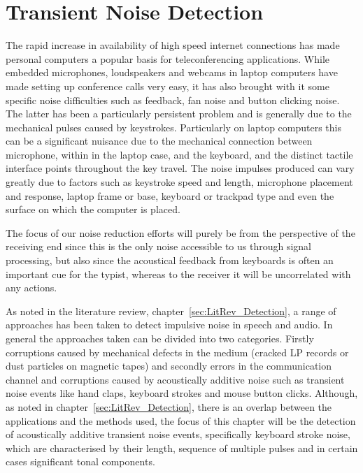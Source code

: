 \chapter{Transient Noise Detection}\label{ch:TransientNoiseDetection}

\ifpdf
    \graphicspath{{Chapter5_TransNoiseDet/Chapter5Figs/PNG/}{Chapter5_TransNoiseDet/Chapter5Figs/PDF/}{Chapter5_TransNoiseDet/Chapter5Figs/}{Chapter5_TransNoiseDet/Chapter5Figs/NoiseBurstModel/}{Chapter5_TransNoiseDet/Chapter5Figs/ARFilterMethod/}}
\else
    \graphicspath{{Chapter5_TransNoiseDet/Chapter5Figs/EPS/}{Chapter5_TransNoiseDet/Chapter5Figs/}}
\fi

The rapid increase in availability of high speed internet connections has made personal computers a popular basis for teleconferencing applications. While embedded microphones, loudspeakers and webcams in laptop computers have made setting up conference calls very easy, it has also brought with it some specific noise difficulties such as feedback, fan noise and button clicking noise. The latter has been a particularly persistent problem and is generally due to the mechanical pulses caused by keystrokes. Particularly on laptop computers this can be a significant nuisance due to the mechanical connection between microphone, within in the laptop case, and the keyboard, and the distinct tactile interface points throughout the key travel. The noise impulses produced can vary greatly due to factors such as keystroke speed and length, microphone placement and response, laptop frame or base, keyboard or trackpad type and even the surface on which the computer is placed.

The focus of our noise reduction efforts will purely be from the perspective of the receiving end since this is the only noise accessible to us through signal processing, but also since the acoustical feedback from keyboards is often an important cue for the typist, whereas to the receiver it will be uncorrelated with any actions.

As noted in the literature review, chapter~\ref{sec:LitRev_Detection}, a range of approaches has been taken to detect impulsive noise in speech and audio. In general the approaches taken can be divided into two categories. Firstly corruptions caused by mechanical defects in the medium (cracked LP records or dust particles on magnetic tapes) and secondly errors in the communication channel and corruptions caused by acoustically additive noise such as transient noise events like hand claps, keyboard strokes and mouse button clicks. Although, as noted in chapter~\ref{sec:LitRev_Detection}, there is an overlap between the applications and the methods used, the focus of this chapter will be the detection of acoustically additive transient noise events, specifically keyboard stroke noise, which are characterised by their length, sequence of multiple pulses and in certain cases significant tonal components.

